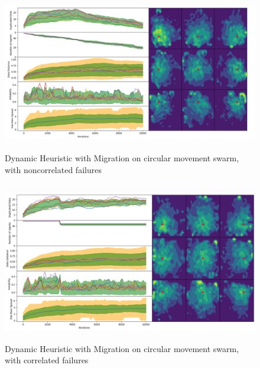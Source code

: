 \documentclass{UoYCSproject}
\begin{document}
\begin{figure}[htb]
\label{fig:circle_movement_non3}
\begin{center}
\centering
\includegraphics[height=7cm]{"./Dynamic_Migration/Circle_Move_non2.png"}
\caption{Dynamic Heuristic with Migration on circular movement swarm, with non\-correlated failures}
\end{center}
\end{figure}

\begin{figure}[htb]
\label{fig:circle_movement_con3}
\begin{center}
\centering
\includegraphics[height=7cm]{"./Dynamic_Migration/Circle_Move_con.png"}
\caption{Dynamic Heuristic with Migration on circular movement swarm, with correlated failures}
\end{center}
\end{figure}

\end{document}
